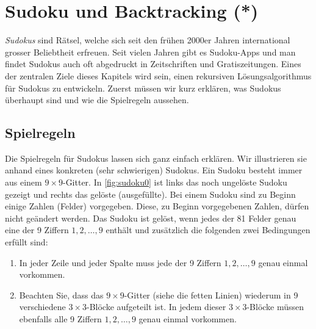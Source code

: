\chapter{Sudoku und Backtracking (*)}\label{ch:Kapitel06}
\textit{Sudokus} sind Rätsel, welche sich seit den frühen 2000er Jahren international grosser Beliebtheit erfreuen. Seit vielen Jahren gibt es Sudoku-Apps und man findet Sudokus auch oft abgedruckt in Zeitschriften und Gratiszeitungen. Eines der zentralen Ziele dieses Kapitels wird sein, einen rekursiven Lösungsalgorithmus für Sudokus zu entwickeln. Zuerst müssen wir kurz erklären, was Sudokus überhaupt sind und wie die Spielregeln aussehen.

\section{Spielregeln}
Die Spielregeln für Sudokus lassen sich ganz einfach erklären. Wir illustrieren sie anhand eines konkreten (sehr schwierigen) Sudokus. Ein Sudoku besteht immer aus einem $9\times 9$-Gitter. In \cref{fig:sudoku0} ist links das noch ungelöste Sudoku gezeigt und rechts das gelöste (ausgefüllte). Bei einem Sudoku sind zu Beginn einige Zahlen (Felder) vorgegeben. Diese, zu Beginn vorgegebenen Zahlen, dürfen nicht geändert werden. Das Sudoku ist gelöst, wenn jedes der 81 Felder genau eine der 9 Ziffern $1,2,\ldots, 9$ enthält und zusätzlich die folgenden zwei Bedingungen erfüllt sind:
\begin{enumerate}
	\item In jeder Zeile und jeder Spalte muss jede der 9 Ziffern $1,2,\ldots, 9$ genau einmal vorkommen.
	\item Beachten Sie, dass das $9\times 9$-Gitter (siehe die fetten Linien) wiederum in 9 verschiedene $3\times 3$-Blöcke aufgeteilt ist. In jedem dieser $3\times 3$-Blöcke müssen ebenfalls alle 9 Ziffern $1,2,\ldots, 9$ genau einmal vorkommen.
\end{enumerate}

